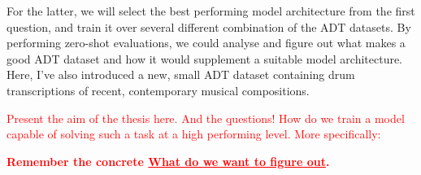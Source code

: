 For the latter, we will select the best performing model architecture from the first question, and train it over several different combination of the \gls{ADT} datasets. By performing zero-shot evaluations, we could analyse and figure out what makes a good \gls{ADT} dataset and how it would supplement a suitable model architecture. Here, I've also introduced a new, small \gls{ADT} dataset containing drum transcriptions of recent, contemporary musical compositions.

\textcolor{red}{
    Present the aim of the thesis here. And the \b{questions!}
How do we train a model capable of solving such a task at a high performing level. More specifically:
}

\textcolor{red}{\textbf{Remember the concrete \underline{What do we want to figure out}.}}